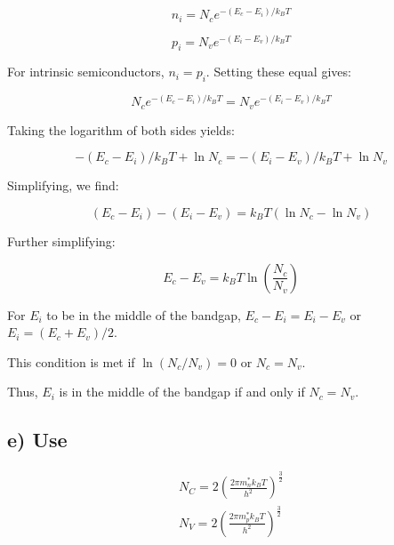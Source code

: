 \begin{equation*}
n_i = N_c e^{-\left(E_c - E_i\right) / k_B T}
\end{equation*}

\begin{equation*}
p_i = N_v e^{-\left(E_i - E_v\right) / k_B T}
\end{equation*}

For intrinsic semiconductors, \( n_i = p_i \). Setting these equal gives:

\begin{equation*}
N_c e^{-\left(E_c - E_i\right) / k_B T} = N_v e^{-\left(E_i - E_v\right) / k_B T}
\end{equation*}

Taking the logarithm of both sides yields:

\begin{equation*}
-\left(E_c - E_i\right) / k_B T + \ln N_c = -\left(E_i - E_v\right) / k_B T + \ln N_v
\end{equation*}

Simplifying, we find:

\begin{equation*}
(E_c - E_i) - (E_i - E_v) = k_B T (\ln N_c - \ln N_v)
\end{equation*}

Further simplifying:

\begin{equation*}
E_c - E_v = k_B T \ln\left(\frac{N_c}{N_v}\right)
\end{equation*}

For \( E_i \) to be in the middle of the bandgap, \( E_c - E_i = E_i - E_v \) or \( E_i = (E_c + E_v)/2 \).

This condition is met if \( \ln(N_c/N_v) = 0 \) or \( N_c = N_v \).

Thus, \( E_i \) is in the middle of the bandgap if and only if \( N_c = N_v \).

\subsection*{e) Use}

\begin{equation*}
    \begin{array}{l}N_{C}=2\left(\frac{2 \pi m_{n}^{*} k_{B} T}{h^{2}}\right)^{\frac{3}{2}} \\ N_{V}=2\left(\frac{2 \pi m_{p}^{*} k_{B} T}{h^{2}}\right)^{\frac{3}{2}}\end{array} 
\end{equation*}

